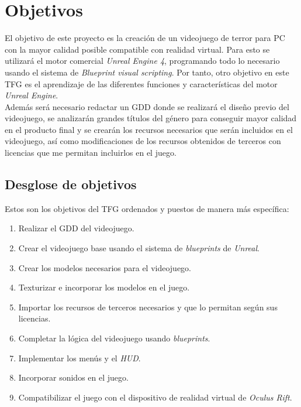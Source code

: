 \chapter{Objetivos}

El objetivo de este proyecto es la creación de un videojuego de terror para PC con la mayor calidad posible compatible con realidad virtual. Para esto se utilizará el motor comercial \textit{Unreal Engine 4}, programando todo lo necesario usando el sistema de \textit{Blueprint visual scripting}. Por tanto, otro objetivo en este \ac{TFG} es el aprendizaje de las diferentes funciones y características del motor \textit{Unreal Engine}.
\\

Además será necesario redactar un \ac{GDD} donde se realizará el diseño previo del videojuego, se analizarán grandes títulos del género para conseguir mayor calidad en el producto final y se crearán los recursos necesarios que serán incluidos en el videojuego, así como modificaciones de los recursos obtenidos de terceros con licencias que me permitan incluirlos en el juego.
\\


\section{Desglose de objetivos}

Estos son los objetivos del \ac{TFG} ordenados y puestos de manera más específica: 

\begin{enumerate}
	\item Realizar el \ac{GDD} del videojuego.
	\item Crear el videojuego base usando el sistema de \textit{blueprints} de \textit{Unreal}.
	\item Crear los modelos necesarios para el videojuego.
	\item Texturizar e incorporar los modelos en el juego.
	\item Importar los recursos de terceros necesarios y que lo permitan según sus licencias.
	\item Completar la lógica del videojuego usando \textit{blueprints}.
	\item Implementar los menús y el \textit{HUD}.
	\item Incorporar sonidos en el juego.
	\item Compatibilizar el juego con el dispositivo de realidad virtual de\textit{ Oculus Rift}.
\end{enumerate}


